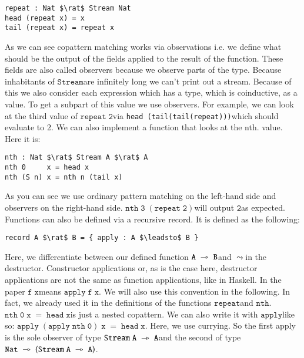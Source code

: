 \documentclass[a4paper,cleardoubleempty,BCOR1cm]{scrbook}
\begin{document}
\begin{lstlisting}
repeat : Nat $\rat$ Stream Nat
head (repeat x) = x
tail (repeat x) = repeat x
\end{lstlisting}

As we can see copattern matching works via observations i.e. we define what
should be the output of the fields applied to the result of the function. These
fields are also called observers because we observe parts of the type.
Because inhabitants of $\mathtt{Stream}$\;are infinitely long we can't print out a
stream. Because of this we also consider each expression which has a type,
which is coinductive, as a value. To get a subpart of this value we use
observers. For example, we can look at the third value of $\mathtt{repeat\;2}$\;via \texttt{head
\;\;(tail\;(tail\;(repeat)))}\;which should evaluate to 2. We can also implement a
function that looks at the nth. value. Here it is:

\begin{lstlisting}
nth : Nat $\rat$ Stream A $\rat$ A
nth 0     x = head x
nth (S n) x = nth n (tail x)
\end{lstlisting}

As you can see we use ordinary pattern matching on the left-hand side and
observers on the right-hand side. $\mathtt{nth\;3\;(repeat\;2)}$\;will output $\mathtt{2}$\;as expected.
Functions can also be defined via a recursive record.  It is defined as the
following:

\begin{lstlisting}
record A $\rat$ B = { apply : A $\leadsto$ B }
\end{lstlisting}

Here, we differentiate between our defined function $\mathtt{A\;\rightarrowtriangle\;B}$\;and $\mathtt{\leadsto}$\;in the
destructor. Constructor applications or, as is the case here, destructor
applications are not the same as function applications, like in Haskell. In the
paper $\mathtt{f\;x}$\;means $\mathtt{apply\;f\;x}$. We will also use this convention in the
following. In fact, we already used it in the definitions of the functions
$\mathtt{repeat}$\;and $\mathtt{nth}$. $\mathtt{nth\;0\;x\;=\;head\;x}$\;is just a nested copattern. We can also write it
with $\mathtt{apply}$\;like so: $\mathtt{apply\;(apply\;nth\;0)\;x\;=\;head\;x}$. Here, we use currying.
So the first apply is the sole observer of type $\mathtt{Stream\;A\;\rightarrowtriangle\;A}$\;and the second
of type $\mathtt{Nat\;\rightarrowtriangle\;(Stream\;A\;\rightarrowtriangle\;A)}$.
\end{document}
